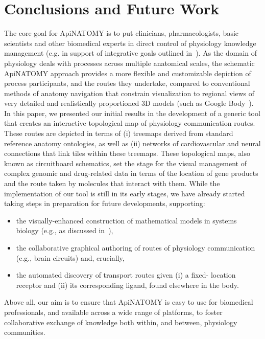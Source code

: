 \section{Conclusions and Future Work} \label{sect:conclusions}                           %

The core goal for ApiNATOMY is to put clinicians, pharmacologists, basic
scientists and other biomedical experts in direct control of physiology
knowledge management (e.g. in support of integrative goals outlined in~\cite{hunter_vision_2010}). As
the domain of physiology deals with processes across multiple anatomical scales,
the schematic ApiNATOMY approach provides a more flexible and customizable
depiction of process participants, and the routes they undertake, compared to
conventional methods of anatomy navigation that constrain visualization to
regional views of very detailed and realistically proportioned 3D models (such as
Google Body~\cite{ZygoteBody}).
In this paper, we presented our initial results in the development of a generic
tool that creates an interactive topological map of physiology communication
routes. These routes are depicted in terms of (i) treemaps derived from standard
reference anatomy ontologies, as well as (ii) networks of cardiovascular and
neural connections that link tiles within these treemaps. These topological maps,
also known as circuitboard schematics, set the stage for the visual management
of complex genomic and drug-related data in terms of the location of gene
products and the route taken by molecules that interact with them. While the
implementation of our tool is still in its early stages, we have already started
taking steps in preparation for future developments, supporting:

\begin{itemize}
  \item the visually-enhanced construction of mathematical models in systems 
biology (e.g., as discussed in~\cite{de_bono_integrating_2012}),
  \item the collaborative graphical authoring of routes of physiology
communication (e.g., brain circuits) and, crucially,
  \item the automated discovery of transport routes given (i) a fixed-
location receptor and (ii) its corresponding ligand, found elsewhere
in the body.
\end{itemize}

Above all, our aim is to ensure that ApiNATOMY is easy to use for biomedical
professionals, and available across a wide range of platforms, to foster
collaborative exchange of knowledge both within, and between, physiology
communities.

